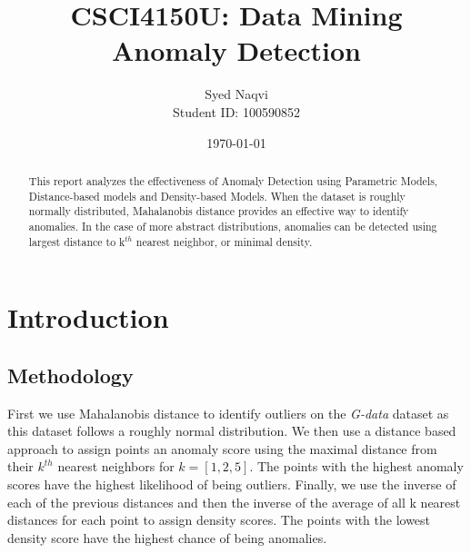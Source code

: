 \documentclass{article}
\title{\textbf{CSCI4150U: Data Mining}\\Anomaly Detection}
\author{Syed Naqvi \\ Student ID: 100590852}
\date{\today}
\begin{document}
\maketitle

\begin{abstract}
This report analyzes the effectiveness of Anomaly Detection using Parametric Models, Distance-based models and Density-based Models. When the
dataset is roughly normally distributed, Mahalanobis distance provides an effective way to identify anomalies. In the case of more abstract
distributions, anomalies can be detected using largest distance to k$^{th}$ nearest neighbor, or minimal density.  
\end{abstract}
    
    

\section{Introduction}

\subsection{Methodology}
First we use Mahalanobis distance to identify outliers on the \textit{G-data} dataset as this dataset follows a roughly normal distribution. We then
use a distance based approach to assign points an anomaly score using the maximal distance from their $k^{th}$ nearest neighbors for $k=[1,2,5]$. The
points with the highest anomaly scores have the highest likelihood of being outliers. Finally, we use the inverse of each of the previous distances
and then the inverse of the average of all k nearest distances for each point to assign density scores. The points with the lowest density score
have the highest chance of being anomalies.  
\end{document}
